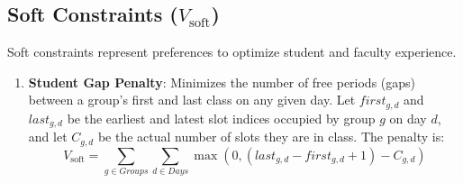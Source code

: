\documentclass[11pt, a4paper]{article}
\begin{document}
\subsection{Soft Constraints ($V_{\text{soft}}$)}
Soft constraints represent preferences to optimize student and faculty experience.
\begin{enumerate}
    \item \textbf{Student Gap Penalty}: Minimizes the number of free periods (gaps) between a group's first and last class on any given day. Let $first_{g,d}$ and $last_{g,d}$ be the earliest and latest slot indices occupied by group $g$ on day $d$, and let $C_{g,d}$ be the actual number of slots they are in class. The penalty is:
    \[
    V_{\text{soft}} = \sum_{g \in Groups} \sum_{d \in Days} \max\left(0, (last_{g,d} - first_{g,d} + 1) - C_{g,d}\right)
    \]
\end{enumerate}
\end{document}
